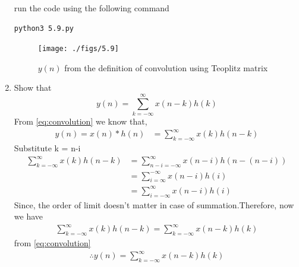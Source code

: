 \documentclass[journal,12pt,twocolumn]{IEEEtran}
\renewcommand\thesection{\arabic{section}}
\begin{document}
\begin{enumerate}[label=\thesection.\arabic*]
run the code using the following command
\begin{lstlisting}
python3 5.9.py
\end{lstlisting}
\begin{figure}[!htbp]
\centering
\texttt{[image: ./figs/5.9]}
\caption{$y(n)$ from the definition of convolution using Teoplitz matrix}
\label{fig:ynconv}
\end{figure}
\item Show that
\begin{equation}
y(n) =  \sum_{k=-\infty}^{\infty}x(n-k)h(k)
\end{equation}
\solution From \eqref{eq:convolution} we know that,
\begin{align}
y(n) = x(n)*h(n) &= \sum_{k=-\infty}^{\infty}x(k)h(n-k)
\end{align}
Substitute k = n-i
\begin{align}
\sum_{k=-\infty}^{\infty}x(k)h(n-k) &= \sum_{n-i=-\infty}^{\infty}x(n-i)h(n-(n-i))\\ &= \sum_{i=\infty}^{-\infty}x(n-i)h(i)\\ &= \sum_{i=-\infty}^{\infty}x(n-i)h(i)
\end{align}
Since, the order of limit doesn't matter in case of summation.Therefore, now we have
\begin{align}
\sum_{k=-\infty}^{\infty}x(k)h(n-k) = \sum_{k=-\infty}^{\infty}x(n-k)h(k)
\end{align}
from \eqref{eq:convolution}
\begin{align}
\therefore y(n) = \sum_{k=-\infty}^{\infty}x(n-k)h(k)
\end{align}
\end{enumerate}
\end{document}
